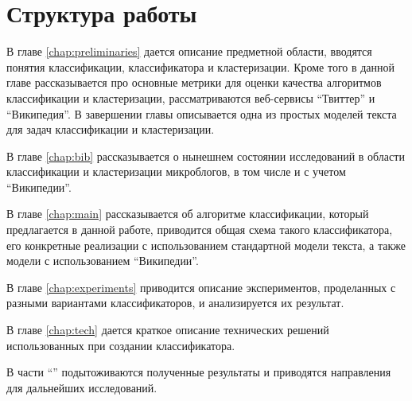 \section{Структура работы}
В главе \ref{chap:preliminaries} дается описание предметной области, вводятся понятия классификации, классификатора и кластеризации. Кроме того в данной главе рассказывается про основные метрики для оценки качества алгоритмов классификации и кластеризации, рассматриваются веб-сервисы ``Твиттер'' и ``Википедия''. В завершении главы описывается одна из простых моделей текста для задач классификации и кластеризации. 

В главе \ref{chap:bib} рассказывается о нынешнем состоянии исследований в области классификации и кластеризации микроблогов, в том числе и с учетом ``Википедии''.

В главе \ref{chap:main} рассказывается об алгоритме классификации, который предлагается в данной работе, приводится общая схема такого классификатора, его конкретные реализации с использованием стандартной модели текста, а также модели с использованием ``Википедии''.

В главе \ref{chap:experiments} приводится описание экспериментов, проделанных с разными вариантами классификаторов, и анализируется их результат.

В главе \ref{chap:tech} дается краткое описание технических решений использованных при создании классификатора.

В части ``'' подытоживаются полученные результаты и приводятся направления для дальнейших исследований.